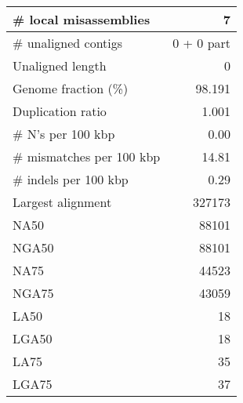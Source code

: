 \documentclass[12pt,a4paper]{article}
\begin{document}
\begin{table}[ht]
\begin{center}
\begin{tabular}{|l*{1}{|r}|}
\# local misassemblies & 7 \\ \hline
\# unaligned contigs & 0 + 0 part \\ \hline
Unaligned length & 0 \\ \hline
Genome fraction (\%) & 98.191 \\ \hline
Duplication ratio & 1.001 \\ \hline
\# N's per 100 kbp & 0.00 \\ \hline
\# mismatches per 100 kbp & 14.81 \\ \hline
\# indels per 100 kbp & 0.29 \\ \hline
Largest alignment & 327173 \\ \hline
NA50 & 88101 \\ \hline
NGA50 & 88101 \\ \hline
NA75 & 44523 \\ \hline
NGA75 & 43059 \\ \hline
LA50 & 18 \\ \hline
LGA50 & 18 \\ \hline
LA75 & 35 \\ \hline
LGA75 & 37 \\ \hline
\end{tabular}
\end{center}
\end{table}
\end{document}
